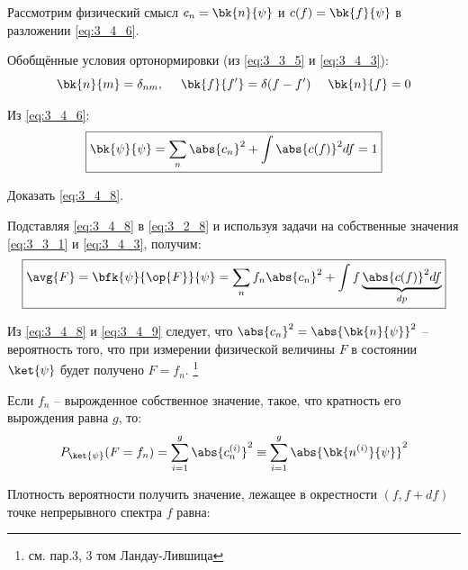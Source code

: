 Рассмотрим физический смысл $c_n = \bk{n}{\psi}$ и $c(f) = \bk{f}{\psi}$ в разложении \eqref{eq:3_4_6}.

Обобщённые условия ортонормировки (из \eqref{eq:3_3_5} и \eqref{eq:3_4_3}):
$$
\bk{n}{m} = \delta_{nm}, ~~~~ \bk{f}{f'} = \delta(f - f') ~~~~ \bk{n}{f} = 0
$$

Из \eqref{eq:3_4_6}:
\begin{equation}
\label{eq:3_4_8}
\boxed {
	\bk{\psi}{\psi} = \sum_n \abs{c_n}^2 + \int \abs{c(f)}^2 df = 1
}
\end{equation}

\begin{excr}
Доказать \eqref{eq:3_4_8}.
\end{excr}

Подставляя \eqref{eq:3_4_8} в \eqref{eq:3_2_8} и используя задачи на собственные значения \eqref{eq:3_3_1} и \eqref{eq:3_4_3}, получим:
\begin{equation}
\label{eq:3_4_9}
\boxed {
	\avg{F} = \bfk{\psi}{\op{F}}{\psi} = \sum_n f_n \abs{c_n}^2 + \int f \underbrace{\abs{c(f)}^2 df}_{dp}
}
\end{equation}

Из \eqref{eq:3_4_8} и \eqref{eq:3_4_9} следует, что $\abs{c_n}^2 = \abs{\bk{n}{\psi}}^2$ -- вероятность того, что при измерении физической величины $F$ в состоянии $\ket{\psi}$ будет получено $F = f_n$. \footnote{см. пар.3, 3 том Ландау-Лившица}

Если $f_n$ -- вырожденное собственное значение, такое, что кратность его вырождения равна $g$, то:
\begin{equation}
\label{eq:3_4_10}
P_{\ket{\psi}}(F = f_n) = \sum_{i=1}^{g} \abs{c_n^{(i)}}^2 \equiv \sum_{i=1}^{g} \abs{ \bk{n^{(i)}}{\psi} }^2
\end{equation}

Плотность вероятности получить значение, лежащее в окрестности $(f, f + df)$ точке непрерывного спектра $f$ равна:

